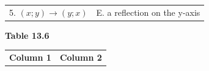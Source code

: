 {{\begin{center}
\begin{tabular}[t]{|l|l|}
5.
                    $\left(x;y\right)\to \left(y;x\right)$
                   &
    
    
        E. a reflection on the y-axis%
     \tabularnewline\cline{1-1}\cline{2-2}
    \end{tabular}
      \end{center}
    \begin{center}{\small\bfseries Table 13.6}\end{center}
    
    \addtocounter{footnote}{-0}
    
          }{ %
        
    
        \begin{center}
      
      \label{m39358*id72595}
      
    \noindent
      \tablelasttail{}
      \begin{xtabular}[t]{|l|l|}\hline
    
    
        
                    \textbf{Column 1}
                   &
    
    
        
                    \textbf{Column 2}
     \tabularnewline{}
    

\end{xtabular}
\end{center}}}
